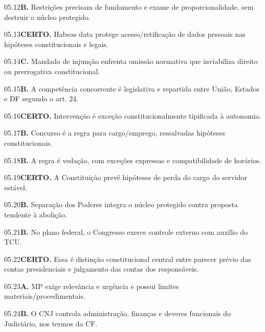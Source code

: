 \begin{solucao}{05.12}\textbf{B.} Restrições precisam de fundamento e exame de proporcionalidade, sem destruir o núcleo protegido.\end{solucao}
\begin{solucao}{05.13}\textbf{CERTO.} Habeas data protege acesso/retificação de dados pessoais nas hipóteses constitucionais e legais.\end{solucao}
\begin{solucao}{05.14}\textbf{C.} Mandado de injunção enfrenta omissão normativa que inviabiliza direito ou prerrogativa constitucional.\end{solucao}
\begin{solucao}{05.15}\textbf{B.} A competência concorrente é legislativa e repartida entre União, Estados e DF segundo o art. 24.\end{solucao}
\begin{solucao}{05.16}\textbf{CERTO.} Intervenção é exceção constitucionalmente tipificada à autonomia.\end{solucao}
\begin{solucao}{05.17}\textbf{B.} Concurso é a regra para cargo/emprego, ressalvadas hipóteses constitucionais.\end{solucao}
\begin{solucao}{05.18}\textbf{B.} A regra é vedação, com exceções expressas e compatibilidade de horários.\end{solucao}
\begin{solucao}{05.19}\textbf{CERTO.} A Constituição prevê hipóteses de perda do cargo do servidor estável.\end{solucao}
\begin{solucao}{05.20}\textbf{B.} Separação dos Poderes integra o núcleo protegido contra proposta tendente à abolição.\end{solucao}
\begin{solucao}{05.21}\textbf{B.} No plano federal, o Congresso exerce controle externo com auxílio do TCU.\end{solucao}
\begin{solucao}{05.22}\textbf{CERTO.} Essa é distinção constitucional central entre parecer prévio das contas presidenciais e julgamento das contas dos responsáveis.\end{solucao}
\begin{solucao}{05.23}\textbf{A.} MP exige relevância e urgência e possui limites materiais/procedimentais.\end{solucao}
\begin{solucao}{05.24}\textbf{B.} O CNJ controla administração, finanças e deveres funcionais do Judiciário, nos termos da CF.\end{solucao}
